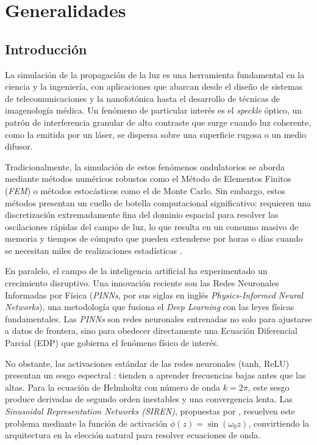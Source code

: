 \chapter{Generalidades}\label{cap1:generalidades}

\section{Introducción}

La simulación de la propagación de la luz es una herramienta fundamental en la
ciencia y la ingeniería, con aplicaciones que abarcan desde el diseño de sistemas
de telecomunicaciones y la nanofotónica hasta el desarrollo de técnicas de
imagenología médica. Un fenómeno de particular interés es el \textit{speckle}
óptico, un patrón de interferencia granular de alto contraste que surge cuando
luz coherente, como la emitida por un láser, se dispersa sobre una superficie
rugosa o un medio difusor.

Tradicionalmente, la simulación de estos fenómenos ondulatorios se aborda
mediante métodos numéricos robustos como el Método de Elementos Finitos
(\textit{FEM}) o métodos estocásticos como el de Monte Carlo. Sin embargo,
estos métodos presentan un cuello de botella computacional significativo:
requieren una discretización extremadamente fina del dominio espacial para
resolver las oscilaciones rápidas del campo de luz, lo que resulta en un
consumo masivo de memoria y tiempos de cómputo que pueden extenderse por horas
o días cuando se necesitan miles de realizaciones estadísticas
\parencite{jin2014finite, goodman2007speckle}.

En paralelo, el campo de la inteligencia artificial ha experimentado un
crecimiento disruptivo. Una innovación reciente son las Redes Neuronales
Informadas por Física (\textit{PINNs}, por sus siglas en inglés
\textit{Physics-Informed Neural Networks}), una metodología que fusiona el
\textit{Deep Learning} con las leyes físicas fundamentales. Las \textit{PINNs}
\parencite{raissi2019physics} son redes neuronales entrenadas no solo para
ajustarse a datos de frontera, sino para obedecer directamente una Ecuación
Diferencial Parcial (EDP) que gobierna el fenómeno físico de interés.

No obstante, las activaciones estándar de las redes neuronales (tanh, ReLU)
presentan un sesgo espectral \parencite{rahaman2019spectral}: tienden a aprender
frecuencias bajas antes que las altas. Para la ecuación de Helmholtz con número
de onda $k = 2\pi$, este sesgo produce derivadas de segundo orden inestables y
una convergencia lenta. Las \textit{Sinusoidal Representation Networks (SIREN)},
propuestas por \textcite{sitzmann2020siren}, resuelven este problema mediante la
función de activación $\phi(z) = \sin(\omega_0 z)$, convirtiendo la arquitectura
en la elección natural para resolver ecuaciones de onda.

